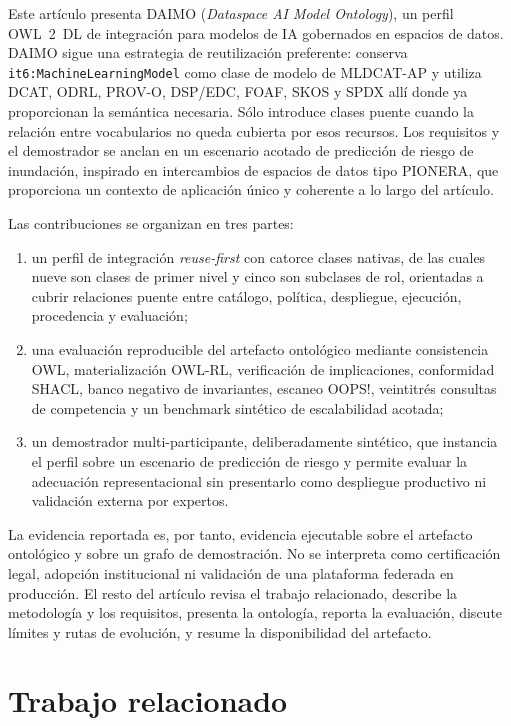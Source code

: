 \documentclass[Afour,sagev,times]{sagej}
\newcommand{\code}[1]{\texttt{#1}}
\begin{document}
Este artículo presenta DAIMO (\emph{Dataspace AI Model Ontology}), un perfil OWL~2~DL de integración para modelos de IA gobernados en espacios de datos. DAIMO sigue una estrategia de reutilización preferente: conserva \code{it6:MachineLearningModel} como clase de modelo de MLDCAT-AP y utiliza DCAT, ODRL, PROV-O, DSP/EDC, FOAF, SKOS y SPDX allí donde ya proporcionan la semántica necesaria. Sólo introduce clases puente cuando la relación entre vocabularios no queda cubierta por esos recursos. Los requisitos y el demostrador se anclan en un escenario acotado de predicción de riesgo de inundación, inspirado en intercambios de espacios de datos tipo PIONERA, que proporciona un contexto de aplicación único y coherente a lo largo del artículo.

Las contribuciones se organizan en tres partes:

\begin{enumerate}[leftmargin=*]
\item un perfil de integración \emph{reuse-first} con catorce clases nativas, de las cuales nueve son clases de primer nivel y cinco son subclases de rol, orientadas a cubrir relaciones puente entre catálogo, política, despliegue, ejecución, procedencia y evaluación;
\item una evaluación reproducible del artefacto ontológico mediante consistencia OWL, materialización OWL-RL, verificación de implicaciones, conformidad SHACL, banco negativo de invariantes, escaneo OOPS!, veintitrés consultas de competencia y un benchmark sintético de escalabilidad acotada;
\item un demostrador multi-participante, deliberadamente sintético, que instancia el perfil sobre un escenario de predicción de riesgo y permite evaluar la adecuación representacional sin presentarlo como despliegue productivo ni validación externa por expertos.
\end{enumerate}

La evidencia reportada es, por tanto, evidencia ejecutable sobre el artefacto ontológico y sobre un grafo de demostración. No se interpreta como certificación legal, adopción institucional ni validación de una plataforma federada en producción. El resto del artículo revisa el trabajo relacionado, describe la metodología y los requisitos, presenta la ontología, reporta la evaluación, discute límites y rutas de evolución, y resume la disponibilidad del artefacto.

\section{Trabajo relacionado}\label{sec:related}
\end{document}
